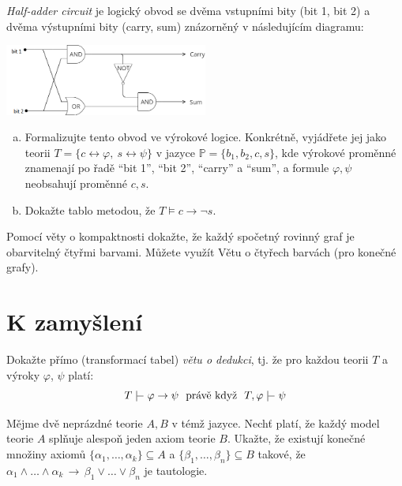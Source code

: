 \documentclass[a4paper,11pt]{amsart}
\begin{document}
\begin{problem}

    \emph{Half-adder circuit} je logický obvod se dvěma vstupními bity (bit 1, bit 2) a dvěma výstupními bity (carry, sum) znázorněný v následujícím diagramu:
    \begin{center}
        \includegraphics[width=0.5\textwidth]{files/half-adder.png}
    \end{center}
    \begin{enumerate}[(a)]
            \item Formalizujte tento obvod ve výrokové logice. Konkrétně, vyjádřete jej jako teorii $T=\{c\leftrightarrow \varphi,\ s\leftrightarrow \psi\}$ v jazyce $\mathbb P=\{b_1,b_2,c,s\}$, kde výrokové proměnné znamenají po řadě ``bit 1'', ``bit 2'', ``carry'' a ``sum'', a formule $\varphi,\psi$ neobsahují proměnné $c,s$.
            \item Dokažte tablo metodou, že $T\models c\to\neg s$.
    \end{enumerate}

\end{problem}


\begin{problem}

    Pomocí věty o kompaktnosti dokažte, že každý spočetný rovinný graf je obarvitelný čtyřmi barvami. Můžete využít Větu o čtyřech barvách (pro konečné grafy).

\end{problem}

        
\section*{K zamyšlení}
        
        
\begin{problem}

    Dokažte přímo (transformací tabel) \emph{větu o dedukci}, tj. že pro každou teorii $T$ a výroky $\varphi$, $\psi$ platí:
    $$
    T \proves \varphi\to\psi\text{\ \ právě když\ \ }T,\varphi\proves  \psi
    $$

\end{problem}


\begin{problem}
    Mějme dvě neprázdné teorie $A, B$ v témž jazyce. Nechť platí, že každý model teorie $A$ splňuje alespoň jeden axiom teorie $B$. Ukažte, že existují konečné množiny axiomů $\{\alpha_1,\dots,\alpha_k\}\subseteq A$ a $\{\beta_1,\dots,\beta_n\}\subseteq B$ takové, že $\alpha_1\wedge\dots\wedge\alpha_k\,\to\,\beta_1\vee\dots\vee\beta_n$ je tautologie.
\end{problem}
\end{document}
